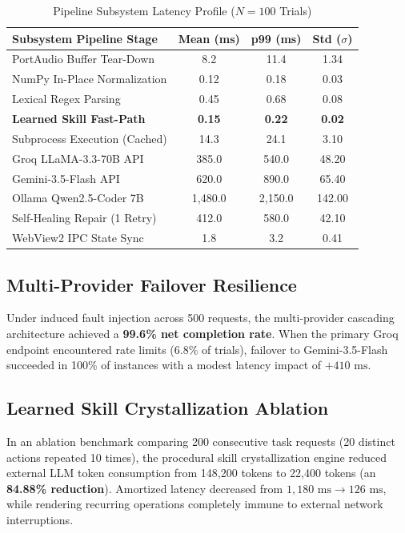 \documentclass[conference]{IEEEtran}
\begin{document}
\begin{table}[htbp]
\centering
\caption{Pipeline Subsystem Latency Profile ($N=100$ Trials)}
\label{tab:latency_benchmarks}
\small
\begin{tabularx}{\columnwidth}{|X|c|c|c|}
\hline
\textbf{Subsystem Pipeline Stage} & \textbf{Mean (ms)} & \textbf{p99 (ms)} & \textbf{Std ($\sigma$)} \\ \hline
PortAudio Buffer Tear-Down & 8.2 & 11.4 & 1.34 \\ \hline
NumPy In-Place Normalization & 0.12 & 0.18 & 0.03 \\ \hline
Lexical Regex Parsing & 0.45 & 0.68 & 0.08 \\ \hline
\textbf{Learned Skill Fast-Path} & \textbf{0.15} & \textbf{0.22} & \textbf{0.02} \\ \hline
Subprocess Execution (Cached) & 14.3 & 24.1 & 3.10 \\ \hline
Groq LLaMA-3.3-70B API & 385.0 & 540.0 & 48.20 \\ \hline
Gemini-3.5-Flash API & 620.0 & 890.0 & 65.40 \\ \hline
Ollama Qwen2.5-Coder 7B & 1,480.0 & 2,150.0 & 142.00 \\ \hline
Self-Healing Repair (1 Retry) & 412.0 & 580.0 & 42.10 \\ \hline
WebView2 IPC State Sync & 1.8 & 3.2 & 0.41 \\ \hline
\end{tabularx}
\end{table}

\subsection{Multi-Provider Failover Resilience}
Under induced fault injection across 500 requests, the multi-provider cascading architecture achieved a \textbf{99.6\% net completion rate}. When the primary Groq endpoint encountered rate limits (6.8\% of trials), failover to Gemini-3.5-Flash succeeded in 100\% of instances with a modest latency impact of $+410\text{ ms}$.

\subsection{Learned Skill Crystallization Ablation}
In an ablation benchmark comparing 200 consecutive task requests (20 distinct actions repeated 10 times), the procedural skill crystallization engine reduced external LLM token consumption from 148,200 tokens to 22,400 tokens (an \textbf{84.88\% reduction}). Amortized latency decreased from $1,180\text{ ms} \to 126\text{ ms}$, while rendering recurring operations completely immune to external network interruptions.
\end{document}
